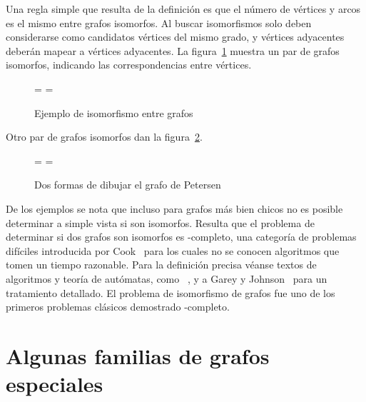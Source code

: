   Una regla simple que resulta de la definición
  es que el número de vértices
  y arcos es el mismo entre grafos isomorfos.
  Al buscar isomorfismos solo deben considerarse como candidatos
  vértices del mismo grado,
  y vértices adyacentes deberán mapear a vértices adyacentes.
  La figura~\ref{fig:isomorfismo}
  muestra un par de grafos isomorfos,
  indicando las correspondencias entre vértices.
  \begin{figure}[htbp]
    =\hbox{}
    =\hbox{}
    \centering
    \hspace{3em}%
    \subfloat{
      \raisebox{0.5\ht1-0.5\ht2}{\copy2}
    }
    \caption{Ejemplo de isomorfismo entre grafos}
    \label{fig:isomorfismo}
  \end{figure}
  Otro par de grafos isomorfos
  dan la figura~\ref{fig:isomorfismo-2}.
  \begin{figure}[htbp]
    =\hbox{}
    =\hbox{}
    \centering
    \hspace{2em}%
    \subfloat{
      \raisebox{0.5\ht1-0.5\ht2}{\copy2}
    }
    \caption[Dos formas de dibujar el grafo de Petersen]
	    {Dos formas de dibujar el grafo de Petersen~%
	      \cite{kempe86:_memoir_theor_mathem_form,
		    petersen98:_sur_tait}}
    \label{fig:isomorfismo-2}
  \end{figure}
  De los ejemplos se nota que incluso para grafos más bien chicos
  no es posible determinar a simple vista si son isomorfos.
  Resulta que el problema de determinar si dos grafos son isomorfos
  es \NP\nobreakdash-completo,%
  una categoría de problemas difíciles introducida por Cook~%
    \cite{cook71:_compl_theor_provin_proced}
  para los cuales no se conocen algoritmos
  que tomen un tiempo razonable.
  Para la definición precisa véanse textos de algoritmos
  y teoría de autómatas,
  como~%
    \cite{aho74:_design_anal_comp_algor,
	  hopcroft06:_intro_autom_theor_languag_comput,
	  parberry94:_probl_algor},
  y a Garey y Johnson~%
    \cite{garey79:_comput_intrac}
  para un tratamiento detallado.
  El problema de isomorfismo de grafos
  fue uno de los primeros problemas clásicos
  demostrado \NP\nobreakdash-completo.

\section{Algunas familias de grafos especiales}
\label{sec:grafos-especiales}


